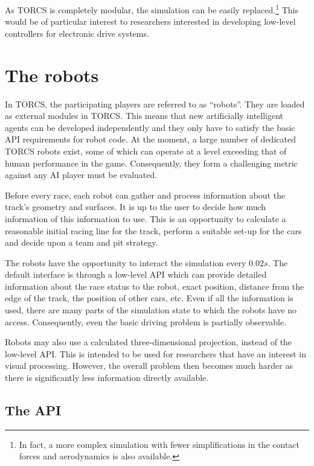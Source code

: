 \documentclass[a4paper]{article}
\begin{document}
As TORCS is completely modular, the simulation can be easily replaced.\footnote{In fact, a more complex simulation with fewer simplifications in the contact forces and aerodynamics is also available.}
This would be of particular interest to researchers interested in developing low-level controllers for electronic drive systems. 

\section{The robots}

In TORCS, the participating players are referred to as ``robots''. They are loaded as external modules in TORCS. This means that new artificially intelligent agents can be developed independently and they only have to satisfy the basic API requirements for robot code. At the moment, a large number of dedicated TORCS robots exist, some of which can operate at a level exceeding that of human performance in the game. Consequently, they form a challenging metric against any AI player must be evaluated.

Before every race, each robot can gather and process information about the track's geometry and surfaces. It is up to the user to decide how much information of this information to use. This is an opportunity to calculate a reasonable initial racing line for the track, perform a suitable set-up for the cars and decide upon a team and pit strategy.

The robots have the opportunity to interact the simulation every $0.02s$. The default interface is through a low-level API which can provide detailed information about the race status to the robot, exact position, distance from the edge of the track, the position of other cars, etc. Even if all the information is used, there are many parts of the simulation state to which the robots have no access. Consequently, even the basic driving problem is partially observable. 

Robots may also use a calculated three-dimensional projection, instead of the low-level API. This is intended to be used for researchers that have an interest in visual processing. However, the overall problem then becomes much harder as there is significantly less information directly available. 

\subsection{The API}
\end{document}
